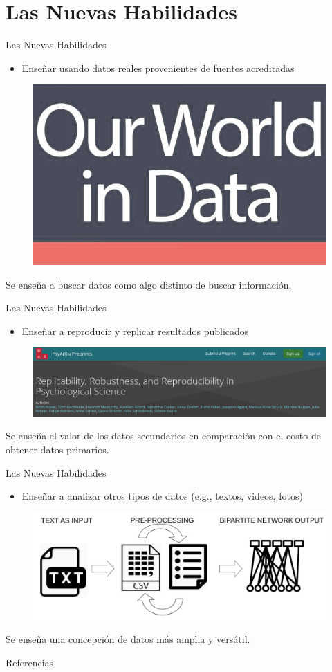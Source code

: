\documentclass{beamer}
\begin{document}
\section{Las Nuevas Habilidades}
\begin{frame}{Las Nuevas Habilidades}
\begin{itemize}
\item Enseñar usando datos reales provenientes de fuentes acreditadas
\end{itemize}    
\begin{figure}
\includegraphics[width=.5\textwidth]{OWD.jpg}
\end{figure}
Se enseña a buscar datos como algo distinto de buscar información.
\end{frame}

\begin{frame}{Las Nuevas Habilidades}
\begin{itemize}
\item Enseñar a reproducir y replicar resultados publicados \cite{nosek2021}
\end{itemize}    
\begin{figure}
\includegraphics[width=1\textwidth]{rep.png}
\end{figure}
Se enseña el valor de los datos secundarios en comparación con el costo de obtener datos primarios.
\end{frame}


\begin{frame}{Las Nuevas Habilidades}
\begin{itemize}
\item Enseñar a analizar otros tipos de datos (e.g., textos, videos, fotos) \cite{Teichert2020}
\end{itemize}    
\begin{figure}
\includegraphics[width=.8\textwidth]{map.png}
\end{figure}
Se enseña una concepción de datos más amplia y versátil.
\end{frame}




\begin{frame}[allowframebreaks]{Referencias}
\tiny

 
\end{frame}
\end{document}
